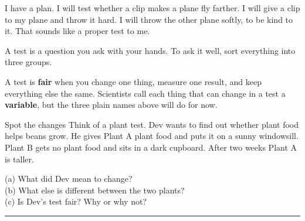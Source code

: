 \begin{multix}[hmm]\multixbot[hmm]\tcblower
I have a plan. I will test whether a clip makes a plane fly farther. I will give a clip to my plane and throw it hard. I will throw the other plane softly, to be kind to it. That sounds like a proper test to me.
\end{multix}

A test is a question you ask with your hands. To ask it well, sort everything into three groups.

\begin{center}
\end{center}

A test is \textbf{fair} when you change one thing, measure one result, and keep everything else the same. Scientists call each thing that can change in a test a \textbf{variable}, but the three plain names above will do for now.

\begin{tryit}{Spot the changes}
Think of a plant test. Dev wants to find out whether plant food helps beans grow. He gives Plant A plant food and puts it on a sunny windowsill. Plant B gets no plant food and sits in a dark cupboard. After two weeks Plant A is taller.\par\medskip
(a) What did Dev mean to change? \wline[5cm]\\[6pt]
(b) What else is different between the two plants? \wline[4.5cm]\\[6pt]
(c) Is Dev's test fair? Why or why not?\\
\rule{\linewidth}{0.5pt}
\end{tryit}

